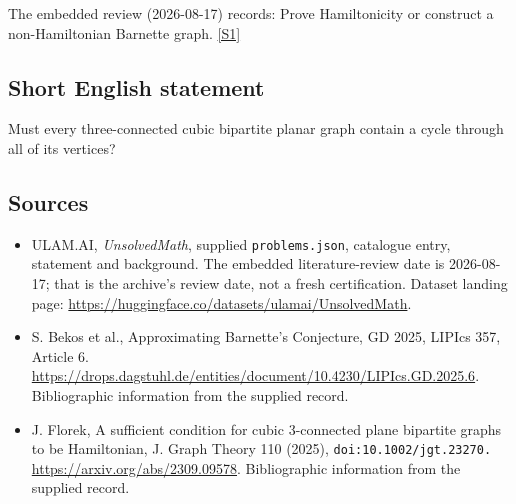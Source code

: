 \documentclass[11pt,a4paper]{article}
\newcommand{\sref}[2]{\hyperlink{source:#1:#2}{[S#2]}}
\begin{document}
The embedded review (2026-08-17) records: Prove Hamiltonicity or construct a non-Hamiltonian Barnette graph. \sref{statement}{1}

\subsection{Short English statement}

Must every three-connected cubic bipartite planar graph contain a cycle through all of its vertices?

\subsection{Sources}

{\small

\begin{itemize}

\item[\hypertarget{source:statement:1}{S1}] ULAM.AI, \emph{UnsolvedMath}, supplied \texttt{problems.json}, catalogue entry, statement and background. The embedded literature-review date is 2026-08-17; that is the archive’s review date, not a fresh certification. Dataset landing page: \url{https://huggingface.co/datasets/ulamai/UnsolvedMath}.

\item[\hypertarget{source:statement:2}{S2}] S. Bekos et al., Approximating Barnette's Conjecture, GD 2025, LIPIcs 357, Article 6. \url{https://drops.dagstuhl.de/entities/document/10.4230/LIPIcs.GD.2025.6}. Bibliographic information from the supplied record.

\item[\hypertarget{source:statement:3}{S3}] J. Florek, A sufficient condition for cubic 3-connected plane bipartite graphs to be Hamiltonian, J. Graph Theory 110 (2025), \nolinkurl{doi:10.1002/jgt.23270.} \url{https://arxiv.org/abs/2309.09578}. Bibliographic information from the supplied record.

\end{itemize}

}

\label{end:statement}
\end{document}
